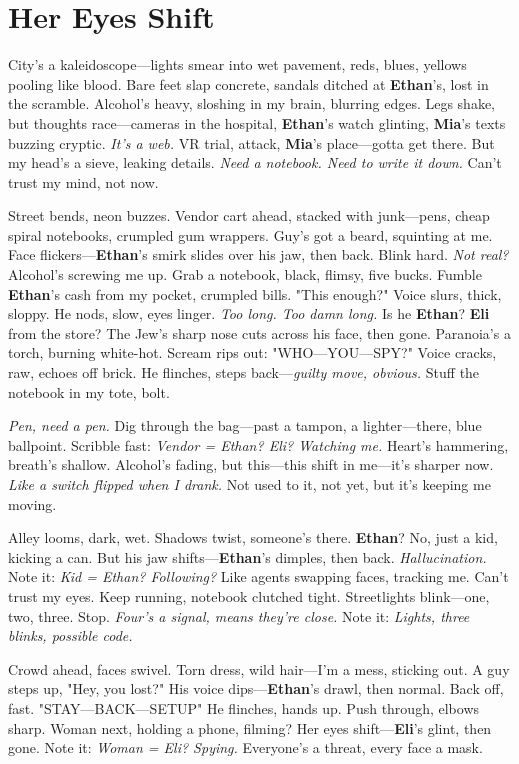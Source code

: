 \documentclass{article}
\begin{document}
\section*{Her Eyes Shift}

City’s a kaleidoscope—lights smear into wet pavement, reds, blues, yellows pooling like blood. Bare feet slap concrete, sandals ditched at \textbf{Ethan}’s, lost in the scramble. Alcohol’s heavy, sloshing in my brain, blurring edges. Legs shake, but thoughts race—cameras in the hospital, \textbf{Ethan}’s watch glinting, \textbf{Mia}’s texts buzzing cryptic. \textit{It’s a web.} VR trial, attack, \textbf{Mia}’s place—gotta get there. But my head’s a sieve, leaking details. \textit{Need a notebook. Need to write it down.} Can’t trust my mind, not now.

Street bends, neon buzzes. Vendor cart ahead, stacked with junk—pens, cheap spiral notebooks, crumpled gum wrappers. Guy’s got a beard, squinting at me. Face flickers—\textbf{Ethan}’s smirk slides over his jaw, then back. Blink hard. \textit{Not real?} Alcohol’s screwing me up. Grab a notebook, black, flimsy, five bucks. Fumble \textbf{Ethan}’s cash from my pocket, crumpled bills. "This enough?" Voice slurs, thick, sloppy. He nods, slow, eyes linger. \textit{Too long. Too damn long.} Is he \textbf{Ethan}? \textbf{Eli} from the store? The Jew’s sharp nose cuts across his face, then gone. Paranoia’s a torch, burning white-hot. Scream rips out: "WHO—YOU—SPY?" Voice cracks, raw, echoes off brick. He flinches, steps back—\textit{guilty move, obvious.} Stuff the notebook in my tote, bolt.

\textit{Pen, need a pen.} Dig through the bag—past a tampon, a lighter—there, blue ballpoint. Scribble fast: \textit{Vendor = Ethan? Eli? Watching me.} Heart’s hammering, breath’s shallow. Alcohol’s fading, but this—this shift in me—it’s sharper now. \textit{Like a switch flipped when I drank.} Not used to it, not yet, but it’s keeping me moving.

Alley looms, dark, wet. Shadows twist, someone’s there. \textbf{Ethan}? No, just a kid, kicking a can. But his jaw shifts—\textbf{Ethan}’s dimples, then back. \textit{Hallucination.} Note it: \textit{Kid = Ethan? Following?} Like agents swapping faces, tracking me. Can’t trust my eyes. Keep running, notebook clutched tight. Streetlights blink—one, two, three. Stop. \textit{Four’s a signal, means they’re close.} Note it: \textit{Lights, three blinks, possible code.}

Crowd ahead, faces swivel. Torn dress, wild hair—I’m a mess, sticking out. A guy steps up, "Hey, you lost?" His voice dips—\textbf{Ethan}’s drawl, then normal. Back off, fast. "STAY—BACK—SETUP" He flinches, hands up. Push through, elbows sharp. Woman next, holding a phone, filming? Her eyes shift—\textbf{Eli}’s glint, then gone. Note it: \textit{Woman = Eli? Spying.} Everyone’s a threat, every face a mask.
\end{document}
